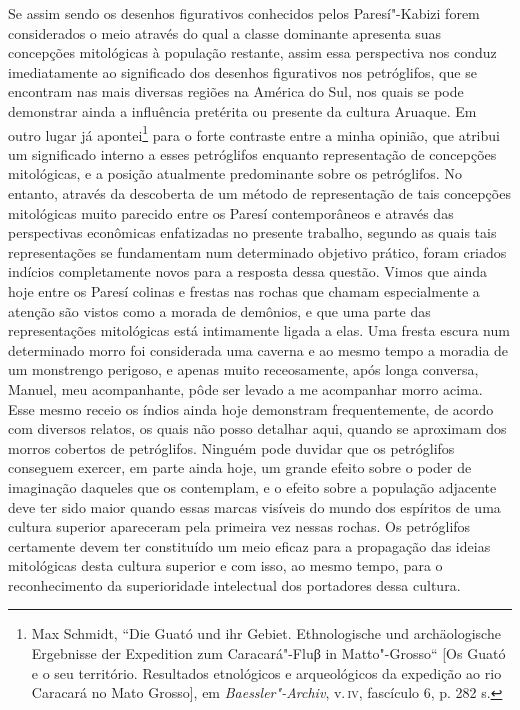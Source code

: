 Se assim sendo os desenhos figurativos conhecidos pelos Paresí"-Kabizi
forem considerados o meio através do qual a classe dominante apresenta
suas concepções mitológicas à população restante, assim essa
perspectiva nos conduz imediatamente ao significado dos desenhos
figurativos nos petróglifos, que se encontram nas mais diversas regiões
na América do Sul, nos quais se pode demonstrar ainda a influência
pretérita ou presente da cultura Aruaque. Em outro lugar já
apontei\footnote{Max Schmidt, ``Die Guató und ihr Gebiet. Ethnologische
  und archäologische Ergebnisse der Expedition zum Caracará"-Fluβ in
  Matto"-Grosso`` {[}Os Guató e o seu território. Resultados etnológicos
  e arqueológicos da expedição ao rio Caracará no Mato Grosso{]}, em
  \emph{Baessler"-Archiv}, v.\,\textsc{iv}, fascículo 6, p. 282 s.} para o forte
contraste entre a minha opinião, que atribui um significado interno a
esses petróglifos enquanto representação de concepções mitológicas, e a
posição atualmente predominante sobre os petróglifos. No entanto,
através da descoberta de um método de representação de tais concepções
mitológicas muito parecido entre os Paresí contemporâneos e através das
perspectivas econômicas enfatizadas no presente trabalho, segundo as
quais tais representações se fundamentam num determinado objetivo
prático, foram criados indícios completamente novos para a resposta
dessa questão. Vimos que ainda hoje entre os Paresí colinas e frestas
nas rochas que chamam especialmente a atenção são vistos como a morada
de demônios, e que uma parte das representações mitológicas está
intimamente ligada a elas. Uma fresta escura num determinado morro foi
considerada uma caverna e ao mesmo tempo a moradia de um monstrengo
perigoso, e apenas muito receosamente, após longa conversa, Manuel, meu
acompanhante, pôde ser levado a me acompanhar morro acima. Esse mesmo
receio os índios ainda hoje demonstram frequentemente, de acordo com
diversos relatos, os quais não posso detalhar aqui, quando se aproximam
dos morros cobertos de petróglifos. Ninguém pode duvidar que os
petróglifos conseguem exercer, em parte ainda hoje, um grande efeito
sobre o poder de imaginação daqueles que os contemplam, e o efeito
sobre a população adjacente deve ter sido maior quando essas marcas
visíveis do mundo dos espíritos de uma cultura superior apareceram pela
primeira vez nessas rochas. Os petróglifos certamente devem ter
constituído um meio eficaz para a propagação das ideias mitológicas
desta cultura superior e com isso, ao mesmo tempo, para o reconhecimento
da superioridade intelectual dos portadores dessa cultura.

